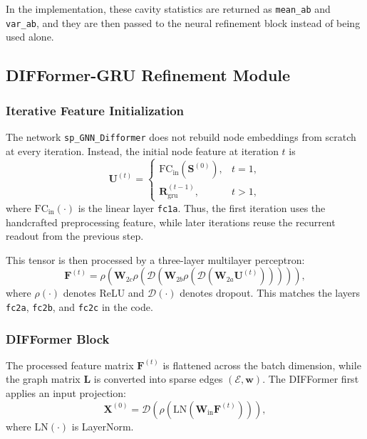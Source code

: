 \documentclass[conference]{IEEEtran}
\begin{document}
In the implementation, these cavity statistics are returned as \texttt{mean\_ab} and \texttt{var\_ab}, and they are then passed to the neural refinement block instead of being used alone.

\subsection{DIFFormer-GRU Refinement Module}

\subsubsection{Iterative Feature Initialization}

The network \texttt{sp\_GNN\_Difformer} does not rebuild node embeddings from scratch at every iteration. Instead, the initial node feature at iteration $t$ is
\begin{equation}
\mathbf{U}^{(t)}=
\begin{cases}
\mathrm{FC}_{\mathrm{in}}\!\left(\mathbf{S}^{(0)}\right), & t=1,\\
\mathbf{R}_{\mathrm{gru}}^{(t-1)}, & t>1,
\end{cases}
\label{eq:iterative_init}
\end{equation}
where $\mathrm{FC}_{\mathrm{in}}(\cdot)$ is the linear layer \texttt{fc1a}. Thus, the first iteration uses the handcrafted preprocessing feature, while later iterations reuse the recurrent readout from the previous step.

This tensor is then processed by a three-layer multilayer perceptron:
\begin{equation}
\mathbf{F}^{(t)}=
\rho\!\left(
\mathbf{W}_{2c}
\rho\!\left(
\mathcal{D}
\left(
\mathbf{W}_{2b}
\rho\!\left(
\mathcal{D}
\left(
\mathbf{W}_{2a}\mathbf{U}^{(t)}
\right)
\right)
\right)
\right)
\right),
\label{eq:mlp_pre}
\end{equation}
where $\rho(\cdot)$ denotes ReLU and $\mathcal{D}(\cdot)$ denotes dropout. This matches the layers \texttt{fc2a}, \texttt{fc2b}, and \texttt{fc2c} in the code.

\subsubsection{DIFFormer Block}

The processed feature matrix $\mathbf{F}^{(t)}$ is flattened across the batch dimension, while the graph matrix $\mathbf{L}$ is converted into sparse edges $(\mathcal{E}, \mathbf{w})$. The DIFFormer first applies an input projection:
\begin{equation}
\mathbf{X}^{(0)}=
\mathcal{D}
\left(
\rho
\left(
\mathrm{LN}\!\left(
\mathbf{W}_{\mathrm{in}}\mathbf{F}^{(t)}
\right)
\right)
\right),
\label{eq:input_proj}
\end{equation}
where $\mathrm{LN}(\cdot)$ is LayerNorm.
\end{document}
